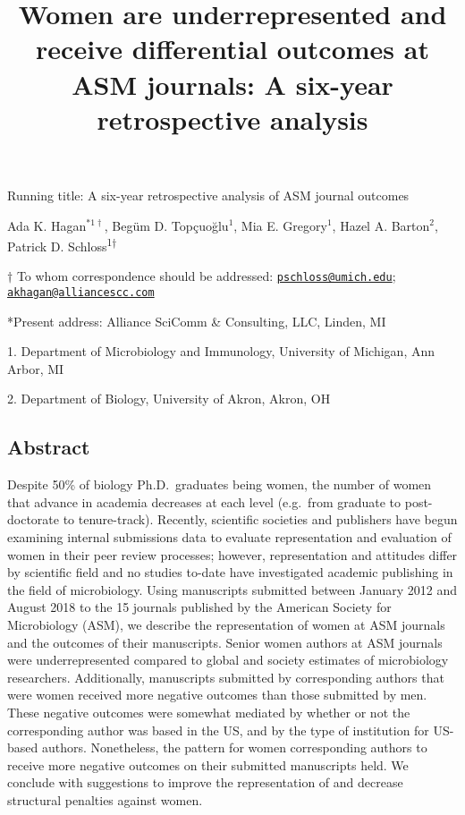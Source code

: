 \documentclass[11pt,]{article}
\title{\textbf{Women are underrepresented and receive differential outcomes at
ASM journals: A six-year retrospective analysis}}
\author{}
\date{}
\begin{document}
\maketitle

\vspace{35mm}

Running title: A six-year retrospective analysis of ASM journal outcomes

\vspace{35mm}

Ada K. Hagan\(^{*1\dagger}\), Begüm D. Topçuoğlu\({^1}\), Mia E.
Gregory\({^1}\), Hazel A. Barton\({^2}\), Patrick D.
Schloss\textsuperscript{1\(\dagger\)}

\vspace{30mm}

\(\dagger\) To whom correspondence should be addressed:
\href{mailto:pschloss@umich.edu}{\nolinkurl{pschloss@umich.edu}};
\href{mailto:akhagan@alliancescc.com}{\nolinkurl{akhagan@alliancescc.com}}

*Present address: Alliance SciComm \& Consulting, LLC, Linden, MI

1. Department of Microbiology and Immunology, University of Michigan,
Ann Arbor, MI

2. Department of Biology, University of Akron, Akron, OH

\newpage
\linenumbers

\hypertarget{abstract}{%
\subsection{Abstract}\label{abstract}}

Despite 50\% of biology Ph.D.~graduates being women, the number of women
that advance in academia decreases at each level (e.g.~from graduate to
post-doctorate to tenure-track). Recently, scientific societies and
publishers have begun examining internal submissions data to evaluate
representation and evaluation of women in their peer review processes;
however, representation and attitudes differ by scientific field and no
studies to-date have investigated academic publishing in the field of
microbiology. Using manuscripts submitted between January 2012 and
August 2018 to the 15 journals published by the American Society for
Microbiology (ASM), we describe the representation of women at ASM
journals and the outcomes of their manuscripts. Senior women authors at
ASM journals were underrepresented compared to global and society
estimates of microbiology researchers. Additionally, manuscripts
submitted by corresponding authors that were women received more
negative outcomes than those submitted by men. These negative outcomes
were somewhat mediated by whether or not the corresponding author was
based in the US, and by the type of institution for US-based authors.
Nonetheless, the pattern for women corresponding authors to receive more
negative outcomes on their submitted manuscripts held. We conclude with
suggestions to improve the representation of and decrease structural
penalties against women.
\end{document}
